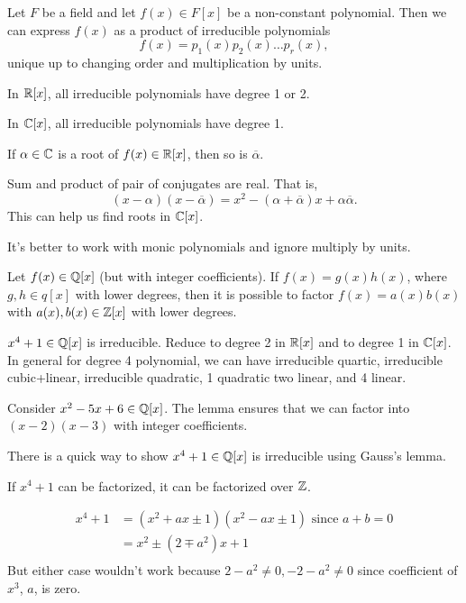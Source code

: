 \documentclass[class=article,crop=false]{standalone}
\begin{document}
\begin{thm}
	Let $ F$ be a field and let  $ f(x) \in F[x]$ be a non-constant polynomial. Then we can express $ f(x)$ as a product of irreducible polynomials
	 \[
		 f(x)=p_1(x) p_2(x) \ldots p_r(x)
	,\]
	unique up to changing order and multiplication by units.
\end{thm}

\begin{prop}[]
	In $ \mathbb{R}[x]$, all irreducible polynomials have degree 1 or 2. 
\end{prop}
\begin{note}[]
 In $ \mathbb{C}[x]$, all irreducible polynomials have degree 1.
\end{note}

\begin{prop}[]
	If $ \alpha \in \mathbb{C}$ is a root of $ f(x) \in \mathbb{R}[x]$, then so is $ \overline{\alpha}$.
\end{prop}

\begin{note}[]
Sum and product of pair of conjugates are real. That is,
\[
	(x-\alpha)(x- \overline{\alpha}) = x^2 - (\alpha + \overline{\alpha})x + \alpha \overline{\alpha}
.\] 
This can help us find roots in $ \mathbb{C}[x]$.
\end{note}

\begin{remark}
It's better to work with monic polynomials and ignore multiply by units.
\end{remark}


\begin{thm}
	Let $ f(x) \in \mathbb{Q}[x]$ (but with integer coefficients). If $ f(x)=g(x)h(x)$, where  $ g,h \in q[x]$ with lower degrees, then it is possible to factor $ f(x) = a(x)b(x)$ with  $ a(x),b(x) \in \mathbb{Z}[x]$ with lower degrees.
\end{thm}
\begin{eg}[]
	$ x^{4} + 1 \in \mathbb{Q}[x]$ is irreducible. Reduce to degree 2 in $ \mathbb{R}[x]$ and to degree 1 in $ \mathbb{C}[x]$. In general for degree 4 polynomial, we can have irreducible quartic, irreducible cubic+linear, irreducible quadratic, 1 quadratic two linear, and 4 linear.
\end{eg}
\begin{eg}[]
	Consider $ x^2-5x+6 \in \mathbb{Q}[x]$. The lemma ensures that we can factor into $ (x-2)(x-3)$ with integer coefficients.
\end{eg}
\begin{eg}[]
	There is a quick way to show $ x^{4}+1 \in \mathbb{Q}[x]$ is irreducible using Gauss's lemma.

	If $ x^{4}+1$ can be factorized, it can be factorized over $ \mathbb{Z}$.

	\begin{align*}
		x^{4}+1 &= (x^2+ax\pm 1)(x^2 -ax \pm 1) \text{ since } a+b=0 \\
			&= x^2 \pm (2\mp a^2) x + 1 \\
	\end{align*}
	But either case wouldn't work because $ 2-a^2 \neq 0, -2-a^2\neq 0$ since coefficient of $ x^3$, $ a$, is zero.
\end{eg}
\end{document}
